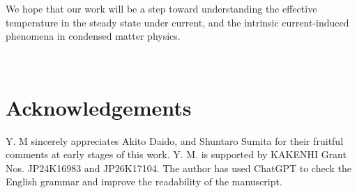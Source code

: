 \documentclass[a4paper, amsfonts, amssymb, amsmath, reprint, showkeys, nofootinbib, twoside,superscriptaddress, prb]{revtex4-2}
\begin{document}
We hope that our work will be a step toward understanding the effective temperature in the steady state under current, and the intrinsic current-induced phenomena in condensed matter physics.

\

\section*{Acknowledgements}
Y. M sincerely appreciates Akito Daido, and Shuntaro Sumita for their fruitful comments at early stages of this work. Y. M. is supported by KAKENHI Grant Nos. JP24K16983 and JP26K17104. 
The author has used ChatGPT to check the English grammar and improve the readability of the manuscript.



%
\end{document}
